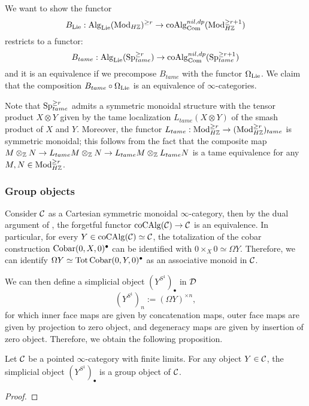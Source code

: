 We want to show the functor 
$$
B_{\operatorname{Lie}}: \operatorname{Alg}_{\operatorname{Lie}}(\operatorname{Mod}_{H{\mathbb{Z}}})^{\geq r} \to \operatorname{coAlg}^{nil, dp}_{\operatorname{Com}}(\operatorname{Mod}_{H{\mathbb{Z}}}^{\geq r+1})
$$ 
restricts to a functor:
$$
B_{tame}: \operatorname{Alg}_{\operatorname{Lie}}(\operatorname{Sp}^{\geq r}_{tame})\to \operatorname{coAlg}^{nil, dp}_{\operatorname{Com}}(\operatorname{Sp}^{\geq r+1}_{tame})
$$
and it is an equivalence if we precompose $B_{tame}$ with the functor $\Omega_{\operatorname{Lie}}$. We claim that the composition $B_{tame}\circ \Omega_{\operatorname{Lie}}$ is an equivalence of $\infty$-categories.

\begin{remark}
\label{symmetric monoidal structure on Mod_Z tame}
	Note that $\operatorname{Sp}^{\geq r}_{tame}$ admits a symmetric monoidal structure with the tensor product $X\otimes Y$ given by the tame localization $L_{tame}(X\otimes Y)$ of the smash product of $X$ and $Y$. 
	Moreover, the functor $L_{tame}:\operatorname{Mod}_{H{\mathbb{Z}}}^{\geq r}\to (\operatorname{Mod}_{H{\mathbb{Z}}}^{\geq r})_{tame}$ is symmetric monoidal; this follows from the fact that the composite map $M \otimes_{{\mathbb{Z}}} N \to L_{tame}M\otimes_{{\mathbb{Z}}} N \to L_{tame}M\otimes_{{\mathbb{Z}}} L_{tame}N$ is a tame equivalence for any $M,N\in \operatorname{Mod}_{H{\mathbb{Z}}}^{\geq r}$.
\end{remark}

\subsubsection{Group objects}
Consider ${\mathcal{C}}$ as a Cartesian symmetric monoidal $\infty$-category, then by the dual argument of \cite[Proposition 2.4.3.9.]{HA}, the forgetful functor $\operatorname{coCAlg}({\mathcal{C}})\to {\mathcal{C}}$ is an equivalence.
In particular, for every $Y\in \operatorname{coCAlg}({\mathcal{C}})\simeq {\mathcal{C}}$, the totalization of the cobar construction $\operatorname{Cobar}(0,X,0)^{\bullet}$ can be identified with $0\times_X 0 \simeq \Omega Y$.
Therefore, we can identify $\Omega Y \simeq \operatorname{\operatorname{Tot}} \operatorname{Cobar}(0,Y,0)^{\bullet}$ as an associative monoid in ${\mathcal{C}}$.


We can then define a simplicial object $(Y^{S^1})_{\bullet}$ in ${\mathcal{D}}$ 
$$
(Y^{S^1})_{n}:=(\Omega Y)^{\times n},
$$ for which inner face maps are given by concatenation maps, outer face maps are given by projection to zero object, and degeneracy maps are given by insertion of zero object. Therefore, we obtain the following proposition.
\begin{proposition}
	Let ${\mathcal{C}}$ be a pointed $\infty$-category with finite limits. For any object $Y\in {\mathcal{C}}$, the simplicial object $(Y^{S^1})_{\bullet}$ is a group object of ${\mathcal{C}}$.
\end{proposition}
\begin{proof}
    
\end{proof}

